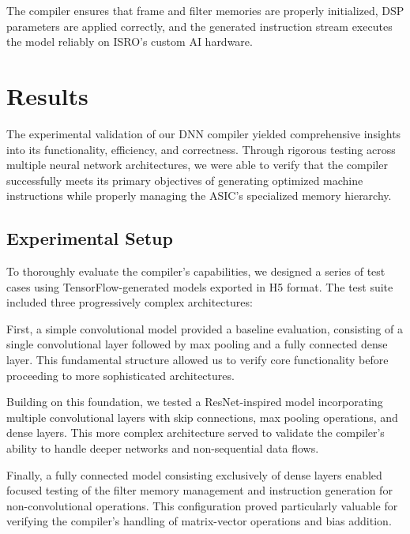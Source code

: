 \documentclass[12pt]{report}
\begin{document}
The compiler ensures that frame and filter memories are properly initialized, DSP parameters are applied correctly, and the generated instruction stream executes the model reliably on ISRO’s custom AI hardware.



\chapter{Results}

The experimental validation of our DNN compiler yielded comprehensive insights into its functionality, efficiency, and correctness. Through rigorous testing across multiple neural network architectures, we were able to verify that the compiler successfully meets its primary objectives of generating optimized machine instructions while properly managing the ASIC's specialized memory hierarchy.

\section{Experimental Setup}
To thoroughly evaluate the compiler's capabilities, we designed a series of test cases using TensorFlow-generated models exported in H5 format. The test suite included three progressively complex architectures:

First, a simple convolutional model provided a baseline evaluation, consisting of a single convolutional layer followed by max pooling and a fully connected dense layer. This fundamental structure allowed us to verify core functionality before proceeding to more sophisticated architectures.

Building on this foundation, we tested a ResNet-inspired model incorporating multiple convolutional layers with skip connections, max pooling operations, and dense layers. This more complex architecture served to validate the compiler's ability to handle deeper networks and non-sequential data flows.

Finally, a fully connected model consisting exclusively of dense layers enabled focused testing of the filter memory management and instruction generation for non-convolutional operations. This configuration proved particularly valuable for verifying the compiler's handling of matrix-vector operations and bias addition.
\end{document}
